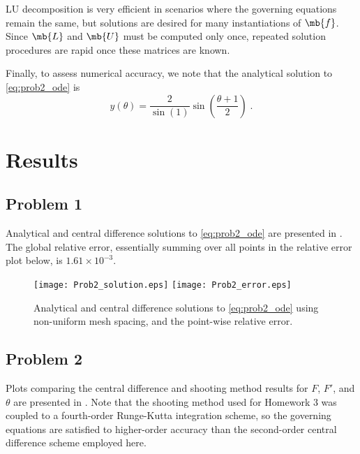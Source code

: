 \documentclass[11pt]{article}
\begin{document}
LU decomposition is very efficient in scenarios where the governing equations remain the same, but solutions are desired for many instantiations of $\mb{f}$. Since $\mb{L}$ and $\mb{U}$ must be computed only once, repeated solution procedures are rapid once these matrices are known.

Finally, to assess numerical accuracy, we note that the analytical solution to \eqref{eq:prob2_ode} is
\begin{equation}
y(\theta) = \frac{2}{\sin(1)} \sin \left( \frac{\theta + 1}{2} \right)
\;.
\end{equation}

\section{Results} %

\subsection{Problem 1}

Analytical and central difference solutions to \eqref{eq:prob2_ode} are presented in . The global relative error, essentially summing over all points in the relative error plot below, is $1.61 \times 10^{-3}$.

\begin{figure}[h!]
\begin{center}
\texttt{[image: Prob2\_solution.eps]}
\texttt{[image: Prob2\_error.eps]}
\\[-0.5cm]
\caption{Analytical and central difference solutions to \eqref{eq:prob2_ode} using non-uniform mesh spacing, and the point-wise relative error.}
\label{fig:Prob2}
\end{center}
\end{figure}

\subsection{Problem 2}

Plots comparing the central difference and shooting method results for $F$, $F'$, and $\theta$ are presented in . Note that the shooting method used for Homework 3 was coupled to a fourth-order Runge-Kutta integration scheme, so the governing equations are satisfied to higher-order accuracy than the second-order central difference scheme employed here.
\end{document}
